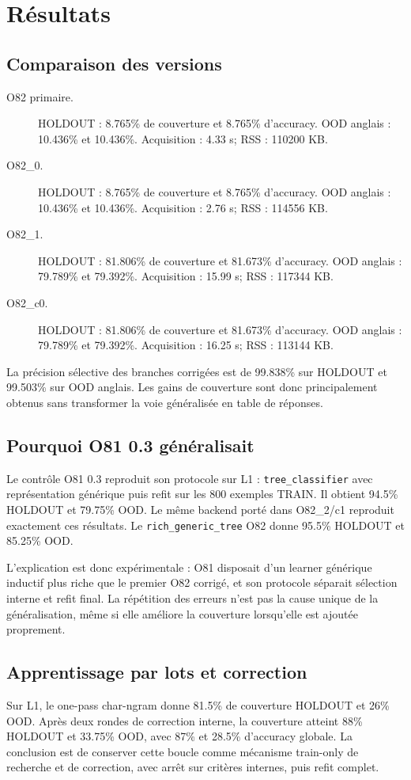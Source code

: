 \documentclass[11pt,a4paper]{report}
\begin{document}
\chapter{Résultats}
\section{Comparaison des versions}
\begin{description}
\item[O82 primaire.] HOLDOUT : 8.765\% de couverture et 8.765\% d'accuracy. OOD anglais : 10.436\% et 10.436\%. Acquisition : 4.33 s; RSS : 110200 KB.
\item[O82\_0.] HOLDOUT : 8.765\% de couverture et 8.765\% d'accuracy. OOD anglais : 10.436\% et 10.436\%. Acquisition : 2.76 s; RSS : 114556 KB.
\item[O82\_1.] HOLDOUT : 81.806\% de couverture et 81.673\% d'accuracy. OOD anglais : 79.789\% et 79.392\%. Acquisition : 15.99 s; RSS : 117344 KB.
\item[O82\_c0.] HOLDOUT : 81.806\% de couverture et 81.673\% d'accuracy. OOD anglais : 79.789\% et 79.392\%. Acquisition : 16.25 s; RSS : 113144 KB.
\end{description}

La précision sélective des branches corrigées est de 99.838\% sur HOLDOUT et 99.503\% sur OOD anglais. Les gains de couverture sont donc principalement obtenus sans transformer la voie généralisée en table de réponses.

\section{Pourquoi O81 0.3 généralisait}
Le contrôle O81 0.3 reproduit son protocole sur L1 : \texttt{tree\_classifier} avec représentation générique puis refit sur les 800 exemples TRAIN. Il obtient 94.5\% HOLDOUT et 79.75\% OOD. Le même backend porté dans O82\_2/c1 reproduit exactement ces résultats. Le \texttt{rich\_generic\_tree} O82 donne 95.5\% HOLDOUT et 85.25\% OOD.

L'explication est donc expérimentale : O81 disposait d'un learner générique inductif plus riche que le premier O82 corrigé, et son protocole séparait sélection interne et refit final. La répétition des erreurs n'est pas la cause unique de la généralisation, même si elle améliore la couverture lorsqu'elle est ajoutée proprement.

\section{Apprentissage par lots et correction}
Sur L1, le one-pass char-ngram donne 81.5\% de couverture HOLDOUT et 26\% OOD. Après deux rondes de correction interne, la couverture atteint 88\% HOLDOUT et 33.75\% OOD, avec 87\% et 28.5\% d'accuracy globale. La conclusion est de conserver cette boucle comme mécanisme train-only de recherche et de correction, avec arrêt sur critères internes, puis refit complet.
\end{document}
